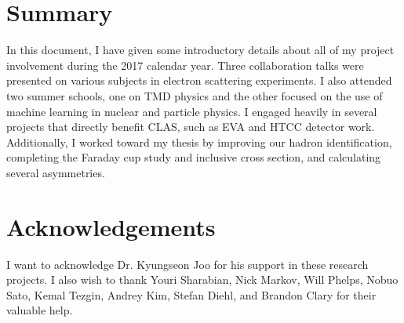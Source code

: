 %
%
\section{Summary}
In this document, I have given some introductory details about all of my project involvement during the 2017 calendar year.  Three collaboration talks were presented on various subjects in electron scattering experiments.  I also attended two summer schools, one on TMD physics and the other focused on the use of machine learning in nuclear and particle physics.  I engaged heavily in several projects that directly benefit CLAS, such as EVA and HTCC detector work.  Additionally, I worked toward my thesis by improving our hadron identification, completing the Faraday cup study and inclusive cross section, and calculating several asymmetries.  

%
%
\section{Acknowledgements}
I want to acknowledge Dr. Kyungseon Joo for his support in these research projects.  I also wish to thank Youri Sharabian, Nick Markov, Will Phelps, Nobuo Sato, Kemal Tezgin, Andrey Kim, Stefan Diehl, and Brandon Clary for their valuable help.  
